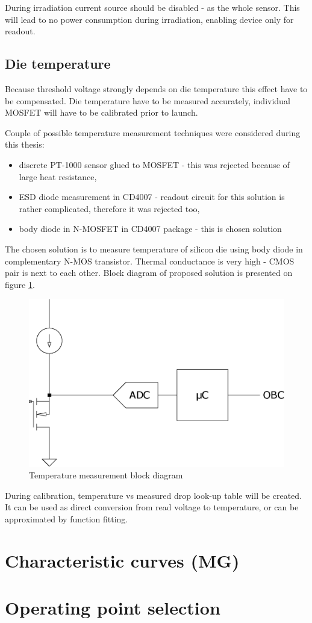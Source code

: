         During irradiation current source should be disabled - as the whole sensor. This will lead to no power consumption during irradiation, enabling device only for readout.

    \subsection{Die temperature}
        Because threshold voltage strongly depends on die temperature this effect have to be compensated. Die temperature have to be measured accurately, individual MOSFET will have to be calibrated prior to launch.

        Couple of possible temperature measurement techniques were considered during this thesis:
        \begin{itemize}
            \item discrete PT-1000 sensor glued to MOSFET - this was rejected because of large heat resistance,
            \item ESD diode measurement in CD4007 - readout circuit for this solution is rather complicated, therefore it was rejected too,
            \item body diode in N-MOSFET in CD4007 package - this is chosen solution
        \end{itemize}

        The chosen solution is to measure temperature of silicon die using body diode in complementary N-MOS transistor. Thermal conductance is very high - CMOS pair is next to each other. Block diagram of proposed solution is presented on figure \ref{Temperature_measurement_block_diagram}.

        \begin{figure}[H]
            \centering
            \includegraphics[width=0.3\paperwidth]{img/n-mos-temperature.eps}
            \caption{Temperature measurement block diagram}
            \label{Temperature_measurement_block_diagram}
        \end{figure}

        During calibration, temperature vs measured drop look-up table will be created. It can be used as direct conversion from read voltage to temperature, or can be approximated by function fitting.

\section{Characteristic curves (MG)}
\section{Operating point selection}
